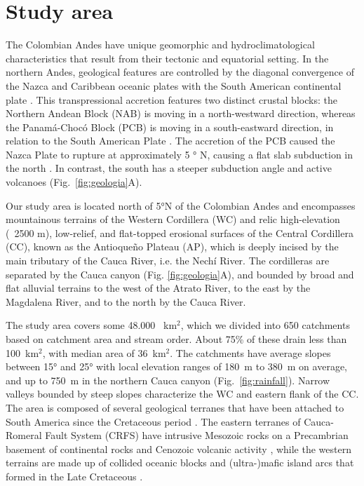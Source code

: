 \documentclass[draft]{agujournal2019}
\begin{document}
\section{Study area}
\par The Colombian Andes have unique geomorphic and hydroclimatological characteristics that result from their tectonic and equatorial setting. In the northern Andes, geological features are controlled by the diagonal convergence of the Nazca and Caribbean oceanic plates with the South American continental plate \cite{Cediel2003, acosta2007, trenkamp2002}. This transpressional accretion features two distinct crustal blocks: the Northern Andean Block (NAB) is moving in a north-westward direction, whereas the Panamá-Chocó Block (PCB) is moving in a south-eastward direction, in relation to the South American Plate \cite{kellogg1995}. The accretion of the PCB caused the Nazca Plate to rupture at approximately 5 ° N, causing a flat slab subduction in the north \cite{Taboada2000}. In contrast, the south has a steeper subduction angle and active volcanoes \cite{perez2021, restrepo2019, farris2011, Taboada2000, mann1990} (Fig.~\ref{fig:geologia}A). 

\par Our study area is located north of 5°N of the Colombian Andes and encompasses mountainous terrains of the Western Cordillera (WC) and relic high-elevation (~2500 m), low-relief, and flat-topped erosional surfaces of the Central Cordillera (CC), known as the Antioqueño Plateau (AP), which is deeply incised by the main tributary of the Cauca River, i.e. the Nechí River. The cordilleras are separated by the Cauca canyon (Fig. \ref{fig:geologia}A), and bounded by broad and flat alluvial terrains to the west of the Atrato River, to the east by the Magdalena River, and to the north by the Cauca River. 

\par The study area covers some 48.000~ km$^2$, which we divided into 650 catchments based on catchment area and stream order. About 75\% of these drain less than 100~km$^{2}$, with median area of 36~km$^{2}$. The catchments have average slopes between 15° and 25° with local elevation ranges of 180~m to 380~m on average, and up to 750~m in the northern Cauca canyon (Fig.~\ref{fig:rainfall}). Narrow valleys bounded by steep slopes characterize the WC and eastern flank of the CC. The area is composed of several geological terranes that have been attached to South America since the Cretaceous period \cite{Cediel2003}. The eastern terranes of Cauca-Romeral Fault System (CRFS) have intrusive Mesozoic rocks on a Precambrian basement of continental rocks and Cenozoic volcanic activity \cite{Cediel2003}, while the western terrains are made up of collided oceanic blocks and (ultra-)mafic island arcs that formed in the Late Cretaceous \cite{cardona2012arc}.
\end{document}
